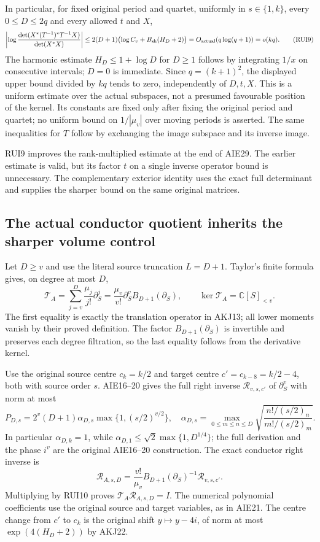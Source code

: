 \documentclass[11pt,a4paper]{article}
\begin{document}
In particular, for fixed original period and quartet, uniformly in
$s\in\{1,k\}$, every $0\le D\le2q$ and every allowed $t$ and $X$,
\[
 \left|\log\frac{
 \det(X^*(T^{-1})^*T^{-1}X)}{\det(X^*X)}\right|
 \le2(D+1)\bigl(\log C_v+B_{\rm sh}(H_D+2)\bigr)
 =O_{\rm actual}(q\log(q+1))=o(kq).
 \tag{RUI9}
\]
The harmonic estimate $H_D\le1+\log D$ for $D\ge1$ follows by
integrating $1/x$ on consecutive intervals; $D=0$ is immediate.
Since $q=(k+1)^2$, the displayed upper bound divided by $kq$ tends
to zero, independently of $D,t,X$. This is a uniform estimate over
the actual subspaces, not a presumed favourable position of the
kernel. Its constants are fixed only after fixing the original period
and quartet; no uniform bound on $1/|\mu_v|$ over moving periods is
asserted. The same inequalities for $T$ follow by exchanging the
image subspace and its inverse image.

RUI9 improves the rank-multiplied estimate at the end of AIE29.
The earlier estimate is valid, but its factor $t$ on a single inverse
operator bound is unnecessary. The complementary exterior identity
uses the exact full determinant and supplies the sharper bound on
the same original matrices.

\subsection{The actual conductor quotient inherits the sharper volume control}
Let $D\ge v$ and use the literal source truncation $L=D+1$.
Taylor's finite formula gives, on degree at most $D$,
\[
 \mathcal T_A=\sum_{j=v}^{D}\frac{\mu_j}{j!}\partial_S^j
             =\frac{\mu_v}{v!}\partial_S^vB_{D+1}(\partial_S),
 \qquad\ker\mathcal T_A=\mathbb C[S]_{<v}.
 \tag{RUI10}
\]
The first equality is exactly the translation operator in AKJ13;
all lower moments vanish by their proved definition. The factor
$B_{D+1}(\partial_S)$ is invertible and preserves each degree
filtration, so the last equality follows from the derivative kernel.

Use the original source centre $c_k=k/2$ and target centre
$c'=c_{k-8}=k/2-4$, both with source order $s$. AIE16--20 gives
the full right inverse $\mathcal R_{v,s,c'}$ of $\partial_S^v$
with norm at most
\[
 P_{D,s}=2^v(D+1)\alpha_{D,s}\max\{1,(s/2)^{v/2}\},
 \quad \alpha_{D,s}=\max_{0\le m\le n\le D}
          \sqrt{\frac{n!/(s/2)_n}{m!/(s/2)_m}}.
 \tag{RUI11}
\]
In particular $\alpha_{D,k}=1$, while
$\alpha_{D,1}\le\sqrt2\max\{1,D^{1/4}\}$; the full derivation
and the phase $i^v$ are the original AIE16--20 construction.
The exact conductor right inverse is
\[
 \mathcal R_{A,s,D}=
 \frac{v!}{\mu_v}B_{D+1}(\partial_S)^{-1}\mathcal R_{v,s,c'}.
 \tag{RUI12}
\]
Multiplying by RUI10 proves $\mathcal T_A\mathcal R_{A,s,D}=I$.
The numerical polynomial coefficients use the original source and
target variables, as in AIE21. The centre change from $c'$ to $c_k$
is the original shift $y\mapsto y-4i$, of norm at most
$\exp(4(H_D+2))$ by AKJ22.
\end{document}
